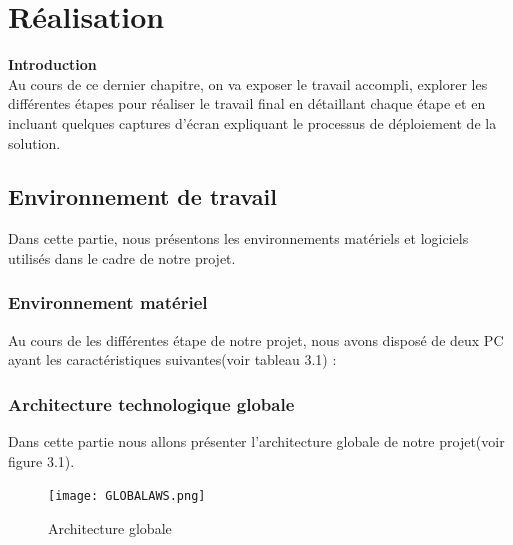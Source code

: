 \chapter{\Large Réalisation}

\textbf{\huge Introduction} \\[1cm]

Au cours de ce dernier chapitre, on va exposer le travail accompli, explorer les différentes étapes pour réaliser le travail final en détaillant chaque étape et en incluant quelques captures d'écran expliquant le processus de déploiement de la solution. \\[0.1cm]
\section{\selectfont\Large  Environnement de travail }
Dans cette partie, nous présentons les environnements matériels et logiciels utilisés dans le
cadre de notre projet.
\subsection{\selectfont\Large  Environnement matériel }
Au cours de les différentes étape de notre projet, nous avons disposé de deux PC ayant les
caractéristiques suivantes(voir tableau 3.1) :
\begin{center}
    \begin{table}[H]  
      \centering
  \caption{Caractéristiques des ordinateurs}
  \end{table}
  \end{center}
  \subsection{\selectfont\Large Architecture technologique globale}
   Dans cette partie nous allons présenter l'architecture globale de notre projet(voir figure 3.1).
\begin{landscape}
  \begin{figure}[htbp]
    \centering
  \texttt{[image: GLOBALAWS.png]}  
    \caption{Architecture globale}
  \end{figure}
\end{landscape}
